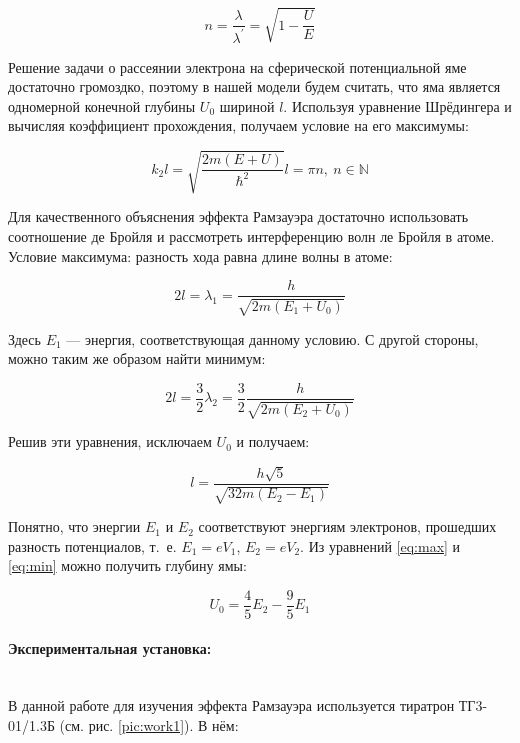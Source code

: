 \documentclass[a4paper, 12pt]{article}
\newcommand{\parag}[1]{\paragraph*{#1:}}
\begin{document}
\begin{equation}
    n = \frac{\lambda}{\lambda^\prime} = \sqrt{1 - \frac{U}{E}}
\end{equation}

Решение задачи о рассеянии электрона на сферической потенциальной яме достаточно громоздко, поэтому в нашей модели будем считать, что яма является одномерной конечной глубины $U_0$ шириной $l$. Используя уравнение Шрёдингера и вычисляя коэффициент прохождения, получаем условие на его максимумы:

\begin{equation}
    k_2 l = \sqrt{\frac{2 m (E + U)}{\hbar^2}}l = \pi n, ~ n \in \mathbb{N} 
\end{equation}

Для качественного объяснения эффекта Рамзауэра достаточно использовать соотношение де Бройля и рассмотреть интерференцию волн ле Бройля в атоме. Условие максимума: разность хода равна длине волны в атоме:

\begin{equation}
    2l = \lambda_1 = \frac{h}{\sqrt{2 m (E_1 + U_0)}}
    \label{eq:max}
\end{equation}

Здесь $E_1$ --- энергия, соответствующая данному условию. С другой стороны, можно таким же образом найти минимум:

\begin{equation}
    2l = \frac{3}{2} \lambda_2 = \frac{3}{2} \frac{h}{\sqrt{2 m (E_2 + U_0)}}
    \label{eq:min}
\end{equation}

Решив эти уравнения, исключаем $U_0$ и получаем:

\begin{equation}
    l = \frac{h \sqrt{5}}{\sqrt{32 m (E_2 - E_1)}}
    \label{eq:without_U}
\end{equation}

Понятно, что энергии $E_1$ и $E_2$ соответствуют энергиям электронов, прошедших разность потенциалов, т.~е. $E_1 = e V_1$, $E_2 = e V_2$. Из уравнений \eqref{eq:max} и \eqref{eq:min} можно получить глубину ямы:

\begin{equation}
    U_0 = \frac{4}{5} E_2 - \frac{9}{5} E_1
    \label{eq:U}
\end{equation}

\parag {Экспериментальная установка}~\\
В данной работе для изучения эффекта Рамзауэра используется тиратрон ТГ3-01/1.3Б (см. рис. \ref{pic:work1}). В нём:
\end{document}
